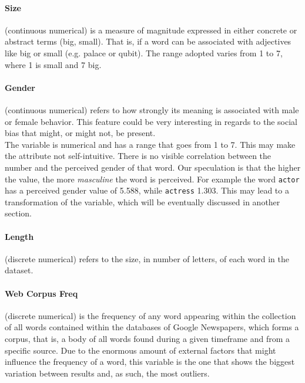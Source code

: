 \documentclass[a4paper,11pt,dvipsnames]{article}
\begin{document}
\paragraph{Size} (continuous numerical) is a measure of magnitude expressed in either concrete or abstract terms (big, small). That is, if a word can be associated with adjectives like big or small (e.g. palace or qubit). The range adopted varies from 1 to 7, where 1 is small and 7 big. 

\paragraph{Gender} (continuous numerical) refers to how strongly its meaning is associated with male or female behavior. This feature could be very interesting in regards to the social bias that might, or might not, be present. \\
The variable is numerical and has a range that goes from 1 to 7. 
This may make the attribute not self-intuitive. There is no visible correlation between the number and the perceived gender of that word. Our speculation is that the higher the value, the more \textit{masculine} the word is perceived. For example the word \texttt{actor} has a perceived gender value of 5.588, while \texttt{actress} 1.303. This may lead to a transformation of the variable, which will be eventually discussed in another section.

\paragraph{Length} (discrete numerical) refers to the size, in number of letters, of each word in the dataset.

\paragraph{Web Corpus Freq} (discrete numerical) is the frequency of any word appearing within the collection of all words contained within the databases of Google Newspapers, which forms a corpus, that is, a body of all words found during a given timeframe and from a specific source. Due to the enormous amount of external factors that might influence the frequency of a word, this variable is the one that shows the biggest variation between results and, as such, the most outliers.
\end{document}
